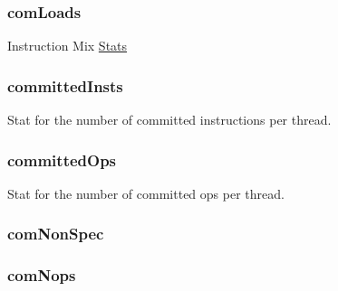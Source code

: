 \hypertarget{classInOrderCPU_ad1256d43890e80b4ef9d1d6fd2ee2286}{
\subsubsection[{comLoads}]{ {\bf comLoads}}}
\label{classInOrderCPU_ad1256d43890e80b4ef9d1d6fd2ee2286}
Instruction Mix \hyperlink{namespaceStats}{Stats} \hypertarget{classInOrderCPU_a45901e46dca5846ddd857aecbee16645}{
\subsubsection[{committedInsts}]{ {\bf committedInsts}}}
\label{classInOrderCPU_a45901e46dca5846ddd857aecbee16645}
Stat for the number of committed instructions per thread. \hypertarget{classInOrderCPU_a16789fd9e4f632e091d740c772094f80}{
\subsubsection[{committedOps}]{ {\bf committedOps}}}
\label{classInOrderCPU_a16789fd9e4f632e091d740c772094f80}
Stat for the number of committed ops per thread. \hypertarget{classInOrderCPU_ac2b81fdbc0cd90a375b12b796c582cf8}{
\subsubsection[{comNonSpec}]{ {\bf comNonSpec}}}
\label{classInOrderCPU_ac2b81fdbc0cd90a375b12b796c582cf8}
\hypertarget{classInOrderCPU_a60adec944be46cf99b376a9c146ab51f}{
\subsubsection[{comNops}]{ {\bf comNops}}}
